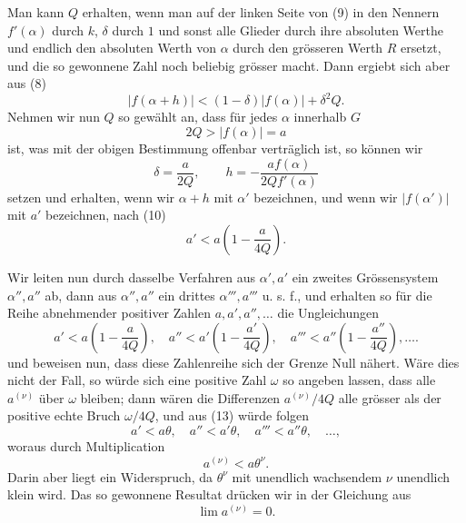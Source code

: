 \documentclass[11pt]{article}
\begin{document}
Man kann $Q$ erhalten, wenn man auf der linken Seite von (9) in den Nennern $f'(\alpha)$ durch $k$, $\delta$ durch $1$ und sonst alle Glieder durch ihre absoluten Werthe und endlich den absoluten Werth von $\alpha$ durch den grösseren Werth $R$ ersetzt, und die so gewonnene Zahl noch beliebig grösser macht. Dann ergiebt sich aber aus (8)
\begin{equation}
 |f(\alpha+h)|<(1-\delta)|f(\alpha)|+\delta^2Q.
\tag{10}
\end{equation}
Nehmen wir nun $Q$ so gewählt an, dass für jedes $\alpha$ innerhalb $G$
\[
 2Q>|f(\alpha)|=a
\]
ist, was mit der obigen Bestimmung offenbar verträglich ist, so können wir
\begin{equation}
 \delta=\frac{a}{2Q},\qquad
 h=-\frac{a f(\alpha)}{2Q f'(\alpha)}
\tag{11}
\end{equation}
setzen und erhalten, wenn wir $\alpha+h$ mit $\alpha'$ bezeichnen, und wenn wir $|f(\alpha')|$ mit $a'$ bezeichnen, nach (10)
\begin{equation}
 a'<a\left(1-\frac{a}{4Q}\right).
\tag{12}
\end{equation}

Wir leiten nun durch dasselbe Verfahren aus $\alpha',a'$ ein zweites Grössensystem $\alpha'',a''$ ab, dann aus $\alpha'',a''$ ein drittes $\alpha''',a'''$ u. s. f., und erhalten so für die Reihe abnehmender positiver Zahlen $a,a',a'',\ldots$ die Ungleichungen
\begin{equation}
 a'<a\left(1-\frac{a}{4Q}\right),\quad
 a''<a'\left(1-\frac{a'}{4Q}\right),\quad
 a'''<a''\left(1-\frac{a''}{4Q}\right),\ldots .
\tag{13}
\end{equation}
und beweisen nun, dass diese Zahlenreihe sich der Grenze Null nähert. Wäre dies nicht der Fall, so würde sich eine positive Zahl $\omega$ so angeben lassen, dass alle $a^{(\nu)}$ über $\omega$ bleiben; dann wären die Differenzen $a^{(\nu)}/4Q$ alle grösser als der positive echte Bruch $\omega/4Q$, und aus (13) würde folgen
\[
 a'<a\theta,
 \quad a''<a'\theta,
 \quad a'''<a''\theta,
 \quad\ldots,
\]
woraus durch Multiplication
\begin{equation}
 a^{(\nu)}<a\theta^\nu.
\tag{14}
\end{equation}
Darin aber liegt ein Widerspruch, da $\theta^\nu$ mit unendlich wachsendem $\nu$ unendlich klein wird. Das so gewonnene Resultat drücken wir in der Gleichung aus
\begin{equation}
 \lim a^{(\nu)}=0.
\tag{15}
\end{equation}
\end{document}

